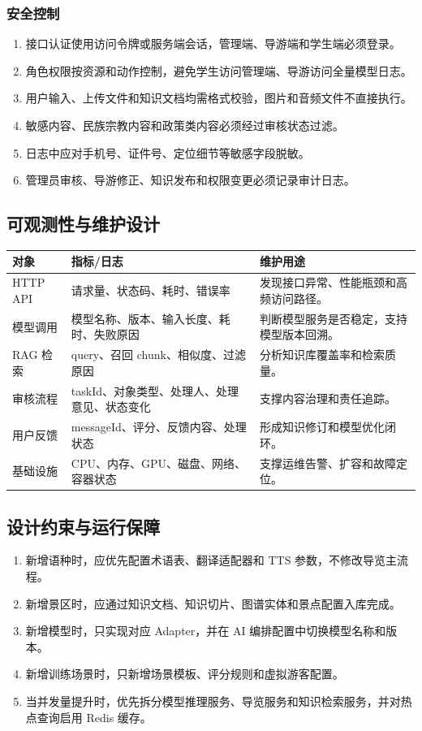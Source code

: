 \subsubsection{安全控制}

\begin{enumerate}
  \item 接口认证使用访问令牌或服务端会话，管理端、导游端和学生端必须登录。
  \item 角色权限按资源和动作控制，避免学生访问管理端、导游访问全量模型日志。
  \item 用户输入、上传文件和知识文档均需格式校验，图片和音频文件不直接执行。
  \item 敏感内容、民族宗教内容和政策类内容必须经过审核状态过滤。
  \item 日志中应对手机号、证件号、定位细节等敏感字段脱敏。
  \item 管理员审核、导游修正、知识发布和权限变更必须记录审计日志。
\end{enumerate}

\subsection{可观测性与维护设计}

\begin{longtable}{p{2.8cm}p{4.2cm}p{6.2cm}}
\toprule
对象 & 指标/日志 & 维护用途 \\
\midrule
HTTP API & 请求量、状态码、耗时、错误率 & 发现接口异常、性能瓶颈和高频访问路径。 \\
模型调用 & 模型名称、版本、输入长度、耗时、失败原因 & 判断模型服务是否稳定，支持模型版本回溯。 \\
RAG 检索 & query、召回 chunk、相似度、过滤原因 & 分析知识库覆盖率和检索质量。 \\
审核流程 & taskId、对象类型、处理人、处理意见、状态变化 & 支撑内容治理和责任追踪。 \\
用户反馈 & messageId、评分、反馈内容、处理状态 & 形成知识修订和模型优化闭环。 \\
基础设施 & CPU、内存、GPU、磁盘、网络、容器状态 & 支撑运维告警、扩容和故障定位。 \\
\bottomrule
\end{longtable}

\subsection{设计约束与运行保障}

\begin{enumerate}
  \item 新增语种时，应优先配置术语表、翻译适配器和 TTS 参数，不修改导览主流程。
  \item 新增景区时，应通过知识文档、知识切片、图谱实体和景点配置入库完成。
  \item 新增模型时，只实现对应 Adapter，并在 AI 编排配置中切换模型名称和版本。
  \item 新增训练场景时，只新增场景模板、评分规则和虚拟游客配置。
  \item 当并发量提升时，优先拆分模型推理服务、导览服务和知识检索服务，并对热点查询启用 Redis 缓存。
\end{enumerate}
